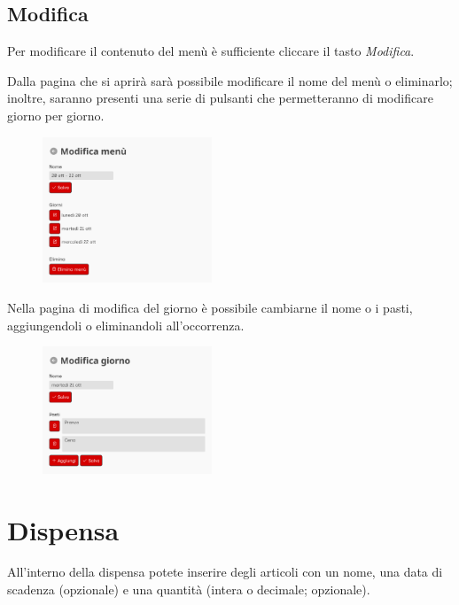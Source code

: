 \documentclass[12pt, a4paper]{article}
\begin{document}
    \subsection{Modifica}

    Per modificare il contenuto del menù è sufficiente cliccare il tasto
    \emph{Modifica}.
    
    Dalla pagina che si aprirà sarà possibile modificare il nome del menù o
    eliminarlo; inoltre, saranno presenti una serie di pulsanti che
    permetteranno di modificare giorno per giorno.

    \begin{figure}[H]
        \centering
        \includegraphics[width=0.45\textwidth]{assets/it/menu_edit.png}
    \end{figure}

    Nella pagina di modifica del giorno è possibile cambiarne il nome o i
    pasti, aggiungendoli o eliminandoli all'occorrenza.

    \begin{figure}[H]
        \centering
        \includegraphics[width=0.45\textwidth]{assets/it/menu_day.png}
    \end{figure}



    \section{Dispensa}

    All'interno della dispensa potete inserire degli articoli con un nome, una
    data di scadenza (opzionale) e una quantità (intera o decimale; opzionale).
\end{document}
